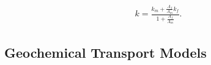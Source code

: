\begin{align} k = \frac{k_m + \frac{A_f}{A_m}k_f}{1+\frac{A_f}{A_m}}.
\label{equivperm} \end{align}

\subsection{Geochemical Transport Models}












